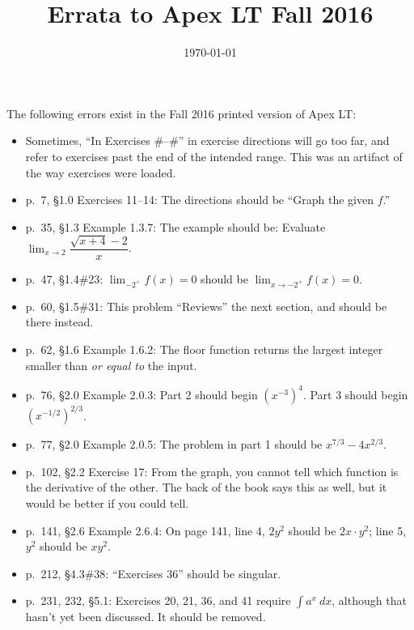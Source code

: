 \documentclass{amsart}
\title{Errata to Apex LT Fall 2016}
\date{\today}
\newif\ifinstructor
\newcommand{\ds}{\displaystyle}
\begin{document}
\maketitle

The following errors exist in the Fall 2016 printed version of Apex LT:
\begin{itemize}
\item Sometimes, ``In Exercises \#--\#'' in exercise directions will go too far, and refer to exercises past the end of the intended range.  This was an artifact of the way exercises were loaded.
\item p.\ 7, \S1.0 Exercises 11--14: The directions should be ``Graph the given $f$.''
\item p.\ 35, \S1.3 Example 1.3.7: The example should be: Evaluate $\ds\lim_{x\to 2}\dfrac{\sqrt{x+4}-2}x$.
\ifinstructor
\item p.\ 39, \S1.3\#33: The answer should be $1/6$.
\item p.\ 47, \S1.4\#13: The answer to parts b and d should be 0.
\fi
\item p.\ 47, \S1.4\#23: $\ds\lim_{-2^+}f(x)=0$ should be $\ds\lim_{x\to-2^+}f(x)=0$.
\item p.\ 60, \S1.5\#31: This problem ``Reviews'' the next section, and should be there instead.
\item p.\ 62, \S1.6 Example 1.6.2: The floor function returns the largest integer smaller than \emph{or equal to} the input.
\ifinstructor
\item p.\ 72, \S1.6\#41: The given answer of $a=1$, $b=-1$ is not continuous at $x=-1$.  The correct answer is $a=\frac34$, $b=-\frac14$.
\fi
\item p.\ 76, \S2.0 Example 2.0.3: Part 2 should begin $(x^{-3})^4$.  Part 3 should begin $(x^{-1/2})^{2/3}$.
\item p.\ 77, \S2.0 Example 2.0.5: The problem in part 1 should be $x^{7/3}-4x^{2/3}$.
\item p.\ 102, \S2.2 Exercise 17: From the graph, you cannot tell which function is the derivative of the other.  The back of the book says this as well, but it would be better if you could tell.
\item p.\ 141, \S2.6 Example 2.6.4: On page 141, line 4, $2y^2$ should be $2x\cdot y^2$; line 5, $y^2$ should be $xy^2$.
\ifinstructor
\item p.\ 207, \S4.2\#19: The solution dimensions give a cost of 60.
\fi
\item p.\ 212, \S4.3\#38: ``Exercises 36'' should be singular.
\item p.\ 231, 232, \S5.1: Exercises 20, 21, 36, and 41 require $\int a^x\ dx$, although that hasn't yet been discussed.  It should be removed.

\end{itemize}
\end{document}
